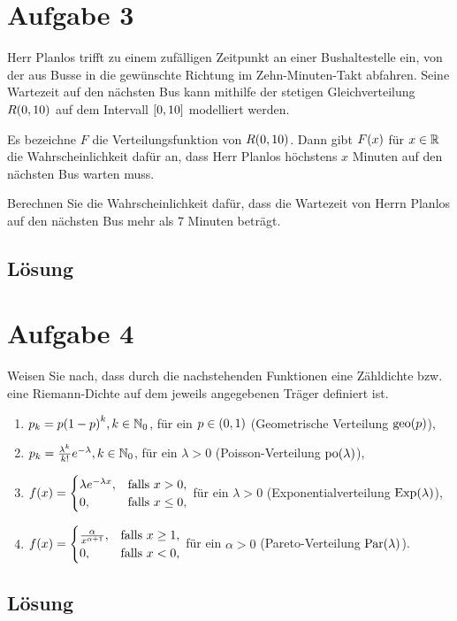 \documentclass{exercise}
\begin{document}
    \section*{Aufgabe 3}

    \begin{problem}
        Herr Planlos trifft zu einem zufälligen Zeitpunkt an einer Bushaltestelle ein, von der aus Busse in die gewünschte Richtung im Zehn-Minuten-Takt abfahren.
        Seine Wartezeit auf den nächsten Bus kann mithilfe der stetigen Gleichverteilung \(R\parentheses*{0, 10}\) auf dem Intervall \(\brackets*{0, 10}\) modelliert werden.

        Es bezeichne \(F\) die Verteilungsfunktion von \(R\parentheses*{0, 10}\).
        Dann gibt \(F\parentheses*{x}\) für \(x \in \R\) die Wahrscheinlichkeit dafür an, dass Herr Planlos höchstens \(x\) Minuten auf den nächsten Bus warten muss.

        Berechnen Sie die Wahrscheinlichkeit dafür, dass die Wartezeit von Herrn Planlos auf den nächsten Bus mehr als 7 Minuten beträgt.
    \end{problem}

    \subsection*{Lösung}


    \section*{Aufgabe 4}

    \begin{problem}
        Weisen Sie nach, dass durch die nachstehenden Funktionen eine Zähldichte bzw. eine Riemann-Dichte auf dem jeweils angegebenen Träger definiert ist.
        \begin{enumerate}
            \item \(p_k = p\parentheses*{1 - p}^k, k \in \N_0\), für ein \(p \in \parentheses*{0, 1}\) (Geometrische Verteilung \(\geo\parentheses*{p}\)),
            \item \(p_k = \frac{\lambda^k}{k!}e^{-\lambda}, k \in \N_0\), für ein \(\lambda > 0\) (Poisson-Verteilung \(\po\parentheses*{\lambda}\)),
            \item \(f\parentheses*{x} = \begin{cases}
                \lambda e^{-\lambda x}, & \text{falls }x > 0,\\
                0, & \text{falls }x \le 0,
            \end{cases}\) für ein \(\lambda > 0\) (Exponentialverteilung \(\Exp\parentheses*{\lambda}\)),
            \item \(f\parentheses*{x} = \begin{cases}
                \frac{\alpha}{x^{\alpha + 1}}, & \text{falls }x \ge 1,\\
                0, & \text{falls }x < 0,
            \end{cases}\) für ein \(\alpha > 0\) (Pareto-Verteilung \(\Par\parentheses*{\lambda}\)).
        \end{enumerate}
    \end{problem}

    \subsection*{Lösung}
\end{document}
